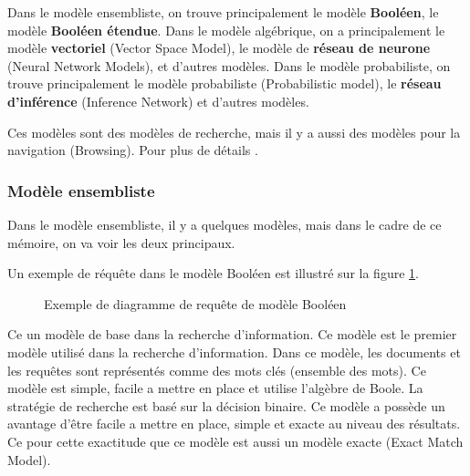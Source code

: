 Dans le modèle ensembliste, on trouve principalement le modèle \textbf{Booléen}, le modèle \textbf{Booléen étendue}. Dans le modèle algébrique, on a principalement le modèle \textbf{vectoriel} (Vector Space Model), le modèle de \textbf{réseau de neurone} (Neural Network Models), et d'autres modèles. Dans le modèle probabiliste, on trouve principalement le modèle probabiliste (Probabilistic model), le \textbf{réseau d'inférence} (Inference Network) et d'autres modèles.

Ces modèles sont des modèles de recherche, mais il y a aussi des modèles pour la navigation (Browsing). Pour plus de détails \citep{modern-ir}.

\subsubsection{Modèle ensembliste}
Dans le modèle ensembliste, il y a quelques modèles, mais dans le cadre de ce mémoire, on va voir les deux principaux.

Un exemple de réquête dans le modèle Booléen est illustré sur la figure \ref{boolean-model}.

\begin{figure}[htbp]
    \begin{center}
        \caption{Exemple de diagramme de requête de modèle Booléen \citep{model-ir}}
    \end{center}
    \label{boolean-model}
\end{figure}

Ce un modèle de base dans la recherche d'information. Ce modèle est le premier modèle utilisé dans la recherche d'information. Dans ce modèle, les documents et les requêtes sont représentés comme des mots clés (ensemble des mots). Ce modèle est simple, facile a mettre en place et utilise l'algèbre de Boole. La stratégie de recherche est basé sur la décision binaire.
Ce modèle a possède un avantage d'être facile a mettre en place, simple et exacte au niveau des résultats. Ce pour cette exactitude que ce modèle est aussi un modèle exacte (Exact Match Model).

